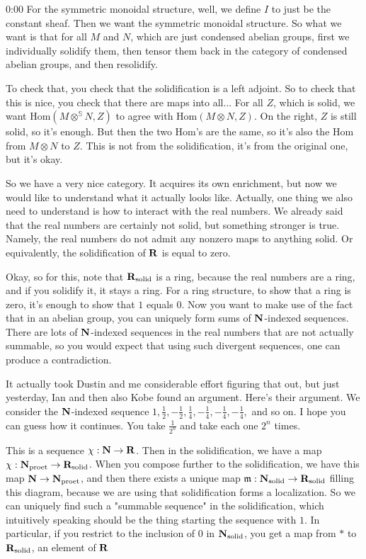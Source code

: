 \begin{unfinished}{0:00}
For the symmetric monoidal structure, well, we define $I$ to just be the constant sheaf. Then we want the symmetric monoidal structure. So what we want is that for all $M$ and $N$, which are just condensed abelian groups, first we individually solidify them, then tensor them back in the category of condensed abelian groups, and then resolidify.

To check that, you check that the solidification is a left adjoint. So to check that this is nice, you check that there are maps into all... For all $Z$, which is solid, we want $\mathrm{Hom}(M\otimes^{\mathbb{S}}N, Z)$ to agree with $\mathrm{Hom}(M\otimes N, Z)$. On the right, $Z$ is still solid, so it's enough. But then the two $\mathrm{Hom}$'s are the same, so it's also the $\mathrm{Hom}$ from $M\otimes N$ to $Z$. This is not from the solidification, it's from the original one, but it's okay.

So we have a very nice category. It acquires its own enrichment, but now we would like to understand what it actually looks like. Actually, one thing we also need to understand is how to interact with the real numbers. We already said that the real numbers are certainly not solid, but something stronger is true. Namely, the real numbers do not admit any nonzero maps to anything solid. Or equivalently, the solidification of $\mathbf R$ is equal to zero.

Okay, so for this, note that $\mathbf R_{\mathrm{solid}}$ is a ring, because the real numbers are a ring, and if you solidify it, it stays a ring. For a ring structure, to show that a ring is zero, it's enough to show that $1$ equals $0$. Now you want to make use of the fact that in an abelian group, you can uniquely form sums of $\mathbf N$-indexed sequences. There are lots of $\mathbf N$-indexed sequences in the real numbers that are not actually summable, so you would expect that using such divergent sequences, one can produce a contradiction.

It actually took Dustin and me considerable effort figuring that out, but just yesterday, Ian and then also Kobe found an argument. Here's their argument. We consider the $\mathbf N$-indexed sequence $1, \frac{1}{2}, -\frac{1}{2}, \frac{1}{4}, -\frac{1}{4}, -\frac{1}{4}, -\frac{1}{4},$ and so on. I hope you can guess how it continues. You take $\frac{1}{2^n}$ and take each one $2^n$ times.

This is a sequence $\chi: \mathbf N \to \mathbf R$. Then in the solidification, we have a map $\chi: \mathbf N_{\mathrm{proet}} \to \mathbf R_{\mathrm{solid}}$. When you compose further to the solidification, we have this map $\mathbf N \to \mathbf N_{\mathrm{proet}}$, and then there exists a unique map $\mathfrak{m}: \mathbf N_{\mathrm{solid}} \to \mathbf R_{\mathrm{solid}}$ filling this diagram, because we are using that solidification forms a localization. So we can uniquely find such a "summable sequence" in the solidification, which intuitively speaking should be the thing starting the sequence with $1$. In particular, if you restrict to the inclusion of $0$ in $\mathbf N_{\mathrm{solid}}$, you get a map from $\ast$ to $\mathbf R_{\mathrm{solid}}$, an element of $\mathbf R$


\end{unfinished}
